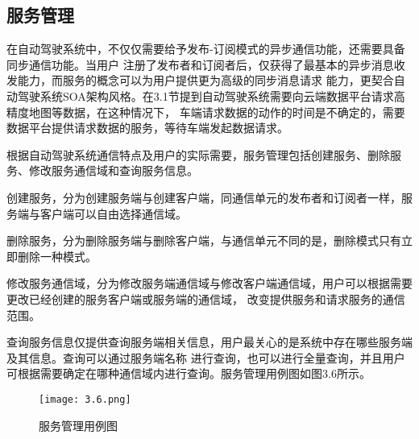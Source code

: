   
\subsection{服务管理}
在自动驾驶系统中，不仅仅需要给予发布-订阅模式的异步通信功能，还需要具备同步通信功能。当用户
注册了发布者和订阅者后，仅获得了最基本的异步消息收发能力，而服务的概念可以为用户提供更为高级的同步消息请求
能力，更契合自动驾驶系统SOA架构风格。在3.1节提到自动驾驶系统需要向云端数据平台请求高精度地图等数据，在这种情况下，
车端请求数据的动作的时间是不确定的，需要数据平台提供请求数据的服务，等待车端发起数据请求。

根据自动驾驶系统通信特点及用户的实际需要，服务管理包括创建服务、删除服务、修改服务通信域和查询服务信息。

创建服务，分为创建服务端与创建客户端，同通信单元的发布者和订阅者一样，服务端与客户端可以自由选择通信域。

删除服务，分为删除服务端与删除客户端，与通信单元不同的是，删除模式只有立即删除一种模式。

修改服务通信域，分为修改服务端通信域与修改客户端通信域，用户可以根据需要更改已经创建的服务客户端或服务端的通信域，
改变提供服务和请求服务的通信范围。

查询服务信息仅提供查询服务端相关信息，用户最关心的是系统中存在哪些服务端及其信息。查询可以通过服务端名称
进行查询，也可以进行全量查询，并且用户可根据需要确定在哪种通信域内进行查询。服务管理用例图如图3.6所示。

\begin{figure}[H]
  \centering
  \texttt{[image: 3.6.png]}
  \caption{服务管理用例图}
  \label{fig:18}
\end{figure}

